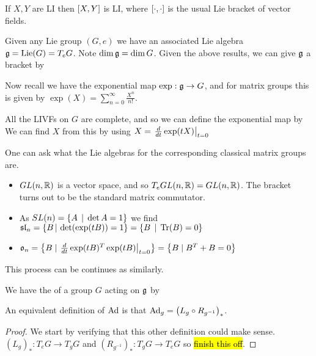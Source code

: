 \documentclass{article}
\begin{document}
\begin{lemma}
If $X,Y$ are LI then $\comm[X]{Y}$ is LI, where $\comm[\cdot]{\cdot}$ is the usual Lie bracket of vector fields. 
\end{lemma}

\begin{remark}
	Given any Lie group $(G,e)$ we have an associated Lie algebra $\mf{g} = \Lie(G) = T_eG$. Note $\dim\mf{g} = \dim G$. Given the above results, we can give $\mf{g}$ a bracket by 
\end{remark}


Now recall we have the exponential map $\exp : \mf{g} \to G$, and for matrix groups this is given by $\exp(X) = \sum_{n=0}^\infty \frac{X^n}{n!}$. 

\begin{remark}
All the LIVFs on $G$ are complete, and so we can define the exponential map by 
We can find $X$ from this by using $X = \ev{\frac{d}{dt} \exp(tX)}{t=0}$
\end{remark}

\begin{example} 
One can ask what the Lie algebras for the corresponding classical matrix groups are. 
\begin{itemize}
    \item $GL(n,\mbb{R})$ is a vector space, and so $T_e GL(n,\mbb{R}) = GL(n,\mbb{R})$. The bracket turns out to be the standard matrix commutator. 
    \item As $SL(n) = \pbrace{A \, \mid \, \det A = 1}$ we find $\mf{sl}_n = \pbrace{B \, | \, \det(\exp(tB)) = 1} = \pbrace{B \, \mid \, \tr(B) = 0}$
    \item $\mf{o}_n = \pbrace{B  \mid  \ev{\frac{d}{dt} \exp(tB)^T \exp(tB)}{t=0}} = \pbrace{B  \mid B^T + B = 0 }$
\end{itemize}
This process can be continues as similarly. 
\end{example}

\begin{definition}
We have the  of a group $G$ acting on $\mf{g}$ by 
\end{definition}

\begin{prop}
	An equivalent definition of $\Ad$ is that $\Ad_g = \pround{L_g \circ R_{g^{-1}}}_\ast $. 
\end{prop}
\begin{proof}
	We start by verifying that this other definition could make sense. $(L_g)_\ast : T_eG \to T_g G$ and $(R_{g^{-1}})_\ast : T_g G \to T_e G$ so 
\hl{finish this off}.
\end{proof}
\end{document}
